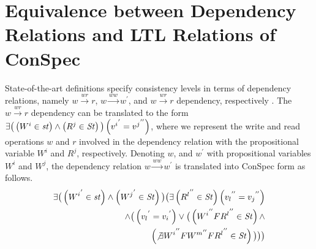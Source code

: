 \documentclass{sig-alternate-05-2015}
\begin{document}
 \section{Equivalence between Dependency Relations and LTL Relations of ConSpec} \label{sec:equiv}
 State-of-the-art definitions specify consistency levels in terms of dependency relations, namely
  $w \xrightarrow{wr} r$,  $w \xrightarrow{ww} w^{'}$, and  $w \xrightarrow{wr} r$ dependency, respectively
  \cite{Hennessy:2011:CAF:1999263}.  The $w \xrightarrow{wr} r$ dependency can be translated to the form
  $\exists \big( %
  \left( W^i \in \mathit{st} \right)
  \wedge \left(  R^j \in \mathit{St} \right) \big) \\ \left( {v^i}^{'} = {v^j}^{''} \right)$, where we represent the write and read operations $w$ and $r$
  involved in the  dependency relation with the propositional variable $W^i$ and $R^j$, respectively. Denoting
  $w$, and $w^{'}$ with propositional variables $W^i$ and $W^j$, the
  dependency relation $w \xrightarrow{ww} w^{'}$ is translated into ConSpec form as follows.
  \begin{align}\label{eqn:ww}
\begin{split}
   \exists \big( %
   \left( {W^i}^{'} \in \mathit{st} \right)
   \wedge \left( {W^j}^{'}  \in  \mathit{St} \right)  \big)
   \big( %
  \exists %
  \left( { R^l}^{''} \in \mathit{St} \right) %
   \left( {v_l}^{''} = {v_j}^{''} \right) \\
   \wedge \big( \left(  {v_l}^{'} = {v_i}^{'} \right) \vee
  \big( \left( {W^i}^{''} F { R^l}^{''} \in \mathit{St} \right) \wedge \\
   \left(  \not\exists {W^i}^{''} F {W^m}^{''} F { R^l}^{''} \in \mathit{St} \right)  \big) \big) \big) %
   \end{split}
   \end{align}
\end{document}
